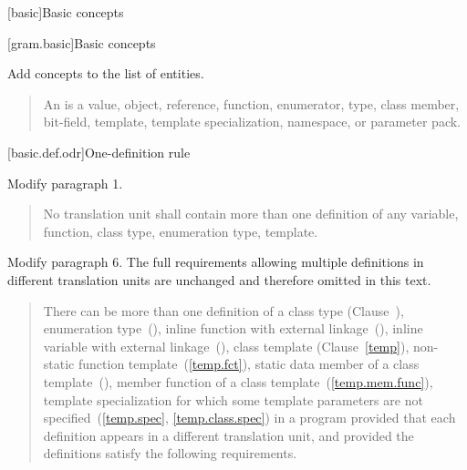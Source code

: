 [basic]{Basic concepts}

[gram.basic]{Basic concepts}

Add concepts to the list of entities.

\begin{quote}
\setcounter{Paras}{2}
\pnum
An  is a value, object, reference, function, enumerator, type,
class member, bit-field, template,  template specialization, 
namespace, or parameter pack.
\end{quote}

[basic.def.odr]{One-definition rule}

Modify paragraph 1.

\begin{quote}
\pnum
No translation unit shall contain more than one definition of any
variable, function, class type, enumeration type, 
 template.
\end{quote}

Modify paragraph 6. The full requirements allowing multiple definitions
in different translation units are unchanged and therefore omitted in this
text.

\begin{quote}
\setcounter{Paras}{5}
\pnum
There can be more than one definition of a class type
(Clause~), enumeration type~(), inline function
with external linkage~(), inline variable with external
linkage~(), class template
(Clause~\ref{temp}), non-static function template~(\ref{temp.fct}),
static data member of a class template~(), member
function of a class template~(\ref{temp.mem.func}),  template
specialization for which some template parameters are not
specified~(\ref{temp.spec}, \ref{temp.class.spec})\added{,}
 in a program provided
that each definition appears in a different translation unit, and
provided the definitions satisfy the following requirements.
\end{quote}

